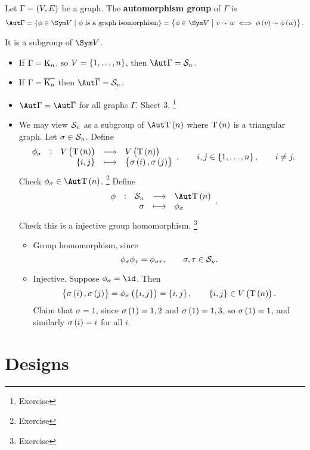 
\begin{definition*}
Let $ \Gamma = \br{V, E} $ be a graph. The \textbf{automorphism group} of $ \Gamma $ is
$$ \Aut \Gamma = \cbr{\phi \in \Sym V \st \phi \ \text{is a graph isomorphism}} = \cbr{\phi \in \Sym V \st v \sim w \iff \phi\br{v} \sim \phi\br{w}}. $$
\end{definition*}

It is a subgroup of $ \Sym V $.

\begin{example*}
\hfill
\begin{itemize}
\item If $ \Gamma = \mathrm{K}_n $, so $ V = \cbr{1, \dots, n} $, then $ \Aut \Gamma = \SSS_n $.
\item If $ \Gamma = \overline{\mathrm{K}_n} $ then $ \Aut \overline{\Gamma} = \SSS_n $.
\item $ \Aut \Gamma = \Aut \overline{\Gamma} $ for all graphs $ \Gamma $. Sheet $ 3 $. \footnote{Exercise}
\item We may view $ \mathcal{S}_n $ as a subgroup of $ \Aut \T\br{n} $ where $ \T\br{n} $ is a triangular graph. Let $ \sigma \in \mathcal{S}_n $. Define
$$ \function[\phi_\sigma]{V\br{\T\br{n}}}{V\br{\T\br{n}}}{\cbr{i, j}}{\cbr{\sigma\br{i}, \sigma\br{j}}}, \qquad i, j \in \cbr{1, \dots, n}, \qquad i \ne j. $$
Check $ \phi_\sigma \in \Aut \T\br{n} $. \footnote{Exercise} Define
$$ \function[\phi]{\SSS_n}{\Aut \T\br{n}}{\sigma}{\phi_\sigma}. $$
Check this is a injective group homomorphism. \footnote{Exercise}
\begin{itemize}
\item Group homomorphism, since
$$ \phi_\sigma\phi_\tau = \phi_{\sigma\tau}, \qquad \sigma, \tau \in \mathcal{S}_n. $$
\item Injective. Suppose $ \phi_\sigma = \id $. Then
$$ \cbr{\sigma\br{i}, \sigma\br{j}} = \phi_\sigma\br{\cbr{i, j}} = \cbr{i, j}, \qquad \cbr{i, j} \in V\br{\T\br{n}}. $$
Claim that $ \sigma = 1 $, since $ \sigma\br{1} = 1, 2 $ and $ \sigma\br{1} = 1, 3 $, so $ \sigma\br{1} = 1 $, and similarly $ \sigma\br{i} = i $ for all $ i $.
\end{itemize}
\end{itemize}
\end{example*}

\pagebreak

\section{Designs}

